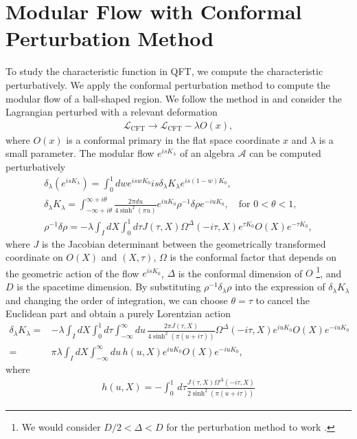 \documentclass[a4paper,11pt]{article}
\theoremstyle{definition}
\begin{document}
\section{Modular Flow with Conformal Perturbation Method}
To study the characteristic function in QFT,  we compute the characteristic perturbatively. We apply the conformal perturbation method to compute the modular flow of a ball-shaped region. We follow the method in \cite{} and consider the Lagrangian perturbed with a relevant deformation 
\begin{align}
    \mathcal{L}_\text{CFT} \to \mathcal{L}_\text{CFT} - \lambda O(x), 
\end{align}
where $O(x)$ is a conformal primary in the flat space coordinate $x$ and $\lambda$ is a small parameter. The modular flow $e^{isK_\lambda}$ of an algebra $\mathcal{A}$ can be computed perturbatively
\begin{gather}
    \delta_\lambda(e^{isK_\lambda}) = \int_0^1 dw e^{iswK_0} is\delta_\lambda K_\lambda e^{is(1-w)K_0} , \\
    \delta_\lambda K_\lambda= \int_{-\infty + i\theta}^{\infty + i\theta} \frac{2\pi du}{4\sinh^2(\pi u)} e^{iuK_0}\rho^{-1}\delta\rho e^{-iuK_0}, \quad\text{for } 0<\theta<1,\\
    \rho^{-1}\delta\rho = -\lambda\int_I dX\int_0^1 d\tau J(\tau,X) \Omega^{\Delta}(-i\tau,X) e^{\tau K_0} O(X) e^{-\tau K_0} ,
\end{gather}
where $J$ is the Jacobian determinant between the geometrically transformed coordinate on $O(X)$ and $(X, \tau)$, $\Omega$ is the conformal factor that depends on the geometric action of the flow $e^{is K_0}$, $\Delta$ is the conformal dimension of $O$ \footnote{We would consider $D/2 < \Delta < D$ for the perturbation method to work \cite{}.}, and $D$ is the spacetime dimension. By substituting $\rho^{-1}\delta_\lambda\rho$ into the expression of $\delta_\lambda K_\lambda$ and changing the order of integration, we can choose $\theta = \tau$ to cancel the Euclidean part and obtain a  purely Lorentzian action \cite{}
\begin{align}
    \delta_\lambda K_\lambda=& -\lambda\int_I dX\int_0^1 d\tau \int_{-\infty}^{\infty} du \, \frac{2\pi J(\tau,X)}{4\sinh^2(\pi (u+i\tau))}   \Omega^{\Delta}(-i\tau,X) e^{iuK_0} O(X) e^{-iuK_0} \\
    =& \pi \lambda\int_I dX \int_{-\infty}^{\infty} du \, h(u,X) e^{iuK_0} O(X) e^{-iuK_0},
\end{align}
where 
\begin{align}
    h(u,X) = -\int_0^1\, d\tau \frac{J(\tau,X)\Omega^{\Delta}(-i\tau,X)}{2\sinh^2(\pi (u+i\tau))} 
\end{align}
\end{document}
